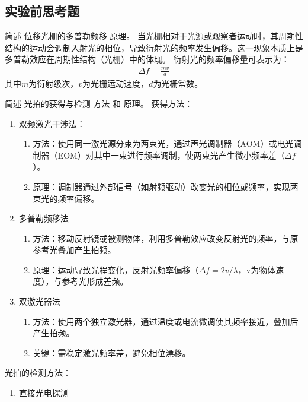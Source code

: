\documentclass[dvipsnames, svgnames,a4paper,11pt]{article}
\begin{document}
\subsection{实验前思考题}
\begin{question}
    简述 位移光栅的多普勒频移 原理。
    \tcblower
    当光栅相对于光源或观察者运动时，其周期性结构的运动会调制入射光的相位，导致衍射光的频率发生偏移。这一现象本质上是多普勒效应在周期性结构（光栅）中的体现。
    衍射光的频率偏移量可表示为：
    \begin{align*}
        \Delta f=\frac{mv}{d}
    \end{align*}
    其中$m$为衍射级次，$v$为光栅运动速度，$d$为光栅常数。
\end{question}

\begin{question}
    简述 光拍的获得与检测 方法 和 原理。
    \tcblower
    获得方法：
    \begin{enumerate}
        \item 双频激光干涉法：
        \begin{enumerate}
            \item 方法：使用同一激光源分束为两束光，通过声光调制器（AOM）或电光调制器（EOM）对其中一束进行频率调制，使两束光产生微小频率差（$\Delta f$）。
            \item 原理：调制器通过外部信号（如射频驱动）改变光的相位或频率，实现两束光的频率偏移。
        \end{enumerate}
        \item 多普勒频移法
        \begin{enumerate}
            \item 方法：移动反射镜或被测物体，利用多普勒效应改变反射光的频率，与原参考光叠加产生拍频。
            \item 原理：运动导致光程变化，反射光频率偏移（$\Delta f = 2v/\lambda$，v为物体速度），与参考光形成差频。
        \end{enumerate}
        \item 双激光器法
        \begin{enumerate}
            \item 方法：使用两个独立激光器，通过温度或电流微调使其频率接近，叠加后产生拍频。
            \item 关键：需稳定激光频率差，避免相位漂移。
        \end{enumerate}
    \end{enumerate}
    光拍的检测方法：
    \begin{enumerate}
        \item 直接光电探测

\end{enumerate}
\end{question}
\end{document}
